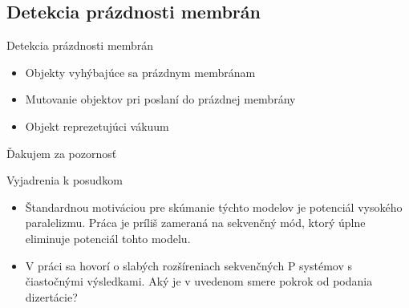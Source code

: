 

\subsection{Detekcia prázdnosti membrán} %
\label{sub:detekcia_pr_zdnosti_membr_n}

\begin{frame}[t]{Detekcia prázdnosti membrán}
  \begin{itemize}
    \item Objekty vyhýbajúce sa prázdnym membránam
    \pause
    \item Mutovanie objektov pri poslaní do prázdnej membrány
    \pause
    \item Objekt reprezetujúci vákuum
  \end{itemize}  
\end{frame}



\begin{frame}[plain]
\begin{center}
  Ďakujem za pozornosť
\end{center}
\end{frame}

\begin{frame}[t]{Vyjadrenia k posudkom}
  \begin{itemize}
    \item Štandardnou motiváciou pre skúmanie týchto modelov je potenciál vysokého paralelizmu. Práca je príliš zameraná na sekvenčný mód, ktorý úplne eliminuje potenciál tohto modelu.
    \pause
    \item V práci sa hovorí o slabých rozšíreniach sekvenčných P systémov s čiastočnými výsledkami. Aký je v uvedenom smere pokrok od podania dizertácie?
  \end{itemize}
\end{frame}

\newsavebox\mytempbib
\savebox\mytempbib{\parbox{\textwidth}{}}

